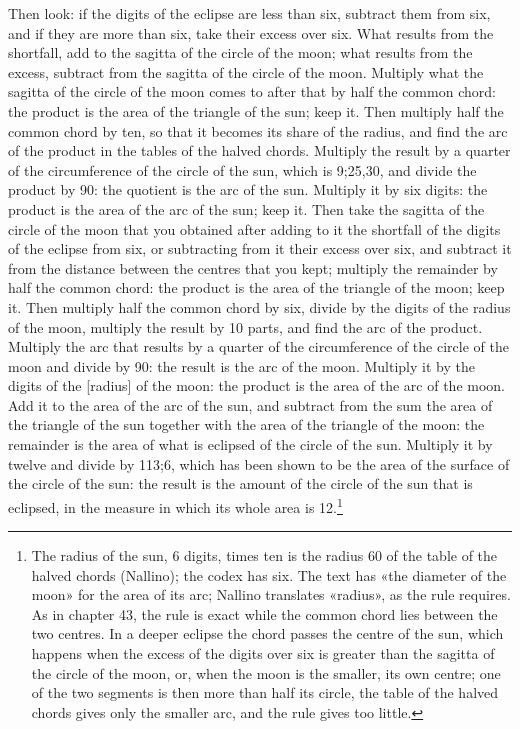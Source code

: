 \documentclass[11pt]{article}
\newcommand{\ArPage}[1]{\marginpar{\footnotesize\color{gray}Ar.\,p.\,#1}}
\begin{document}
\par \ArPage{165}Then look: if the digits of the eclipse are less than six, subtract them from six, and if they are more than six, take their excess over six. What results from the shortfall, add to the sagitta of the circle of the moon; what results from the excess, subtract from the sagitta of the circle of the moon. Multiply what the sagitta of the circle of the moon comes to after that by half the common chord: the product is the area of the triangle of the sun; keep it. Then multiply half the common chord by ten, so that it becomes its share of the radius, and find the arc of the product in the tables of the halved chords. Multiply the result by a quarter of the circumference of the circle of the sun, which is 9;25,30, and divide the product by 90: the quotient is the arc of the sun. Multiply it by six digits: the product is the area of the arc of the sun; keep it. Then take the sagitta of the circle of the moon that you obtained after adding to it the shortfall of the digits of the eclipse from six, or subtracting from it their excess over six, and subtract it from the distance between the centres that you kept; multiply the remainder by half the common chord: the product is the area of the triangle of the moon; keep it. Then multiply half the common chord by six, divide by the digits of the radius of the moon, multiply the result by 10 parts, and find the arc of the product. Multiply the arc that results by a quarter of the circumference of the circle of the moon and divide by 90: the result is the arc of the moon. Multiply it by the digits of the [radius] of the moon: the product is the area of the arc of the moon. Add it to the area of the arc of the sun, and subtract from the sum the area of the triangle of the sun together with the area of the triangle of the moon: the remainder is the area of what is eclipsed of the circle of the sun. Multiply it by twelve and divide by 113;6, which has been shown to be the area of the surface of the circle of the sun: the result is the amount of the circle of the sun that is eclipsed, in the measure in which its whole area is 12.\footnote{The radius of the sun, 6 digits, times ten is the radius 60 of the table of the halved chords (Nallino); the codex has six. The text has «the diameter of the moon» for the area of its arc; Nallino translates «radius», as the rule requires. As in chapter 43, the rule is exact while the common chord lies between the two centres. In a deeper eclipse the chord passes the centre of the sun, which happens when the excess of the digits over six is greater than the sagitta of the circle of the moon, or, when the moon is the smaller, its own centre; one of the two segments is then more than half its circle, the table of the halved chords gives only the smaller arc, and the rule gives too little.}\par
\end{document}
